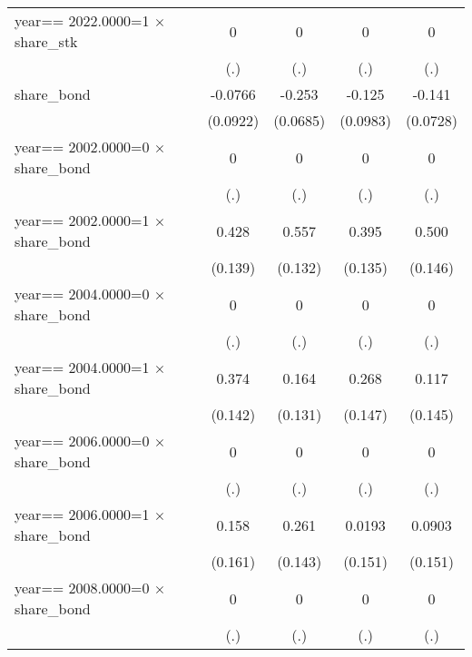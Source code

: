 \begin{table}[htbp]
\begin{tabular}{l*{4}{c}}
year==  2022.0000=1 $\times$ share\_stk&        0         &        0         &        0         &        0         \\
                &      (.)         &      (.)         &      (.)         &      (.)         \\
\addlinespace
share\_bond      &  -0.0766         &   -0.253\sym{***}&   -0.125         &   -0.141\sym{*}  \\
                & (0.0922)         & (0.0685)         & (0.0983)         & (0.0728)         \\
\addlinespace
year==  2002.0000=0 $\times$ share\_bond&        0         &        0         &        0         &        0         \\
                &      (.)         &      (.)         &      (.)         &      (.)         \\
\addlinespace
year==  2002.0000=1 $\times$ share\_bond&    0.428\sym{***}&    0.557\sym{***}&    0.395\sym{***}&    0.500\sym{***}\\
                &  (0.139)         &  (0.132)         &  (0.135)         &  (0.146)         \\
\addlinespace
year==  2004.0000=0 $\times$ share\_bond&        0         &        0         &        0         &        0         \\
                &      (.)         &      (.)         &      (.)         &      (.)         \\
\addlinespace
year==  2004.0000=1 $\times$ share\_bond&    0.374\sym{***}&    0.164         &    0.268\sym{*}  &    0.117         \\
                &  (0.142)         &  (0.131)         &  (0.147)         &  (0.145)         \\
\addlinespace
year==  2006.0000=0 $\times$ share\_bond&        0         &        0         &        0         &        0         \\
                &      (.)         &      (.)         &      (.)         &      (.)         \\
\addlinespace
year==  2006.0000=1 $\times$ share\_bond&    0.158         &    0.261\sym{*}  &   0.0193         &   0.0903         \\
                &  (0.161)         &  (0.143)         &  (0.151)         &  (0.151)         \\
\addlinespace
year==  2008.0000=0 $\times$ share\_bond&        0         &        0         &        0         &        0         \\
                &      (.)         &      (.)         &      (.)         &      (.)         \\

\end{tabular}
\end{table}
